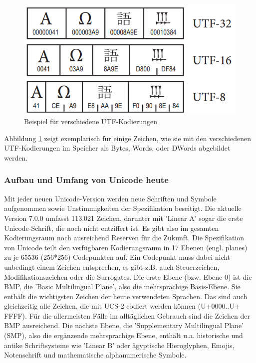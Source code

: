 \begin{figure}[h]
\centering
\includegraphics[width=.67\textwidth]{img/utf-8-16-32.png}
\caption[Vergleich verschiedener UTF-Kodierungen]{Beispiel für verschiedene UTF-Kodierungen\footnotemark}
\label{UTF}
\end{figure}


Abbildung \ref{UTF} zeigt exemplarisch für einige Zeichen, wie sie mit den verschiedenen UTF-Kodierungen im Speicher als Bytes, Words, oder DWords abgebildet werden.

\subsubsection{Aufbau und Umfang von Unicode heute}
Mit jeder neuen Unicode-Version werden neue Schriften und Symbole aufgenommen sowie Unstimmigkeiten der Spezifikation beseitigt.
Die aktuelle Version 7.0.0 umfasst 113.021 Zeichen, darunter mit 'Linear A' sogar die erste Unicode-Schrift, die noch nicht entziffert ist.
Es gibt also im gesamten Kodierungsraum noch ausreichend Reserven für die Zukunft.
Die Spezifikation von Unicode teilt den verfügbaren Kodierungsraum in 17 Ebenen (engl. planes) zu je 65536 (256*256) Codepunkten auf.
Ein Codepunkt muss dabei nicht unbedingt einem Zeichen entsprechen, es gibt z.B. auch Steuerzeichen, Modifikationszeichen oder die Surrogates.
Die erste Ebene (bzw. Ebene 0) ist die BMP, die 'Basic Multilingual Plane', also die mehrsprachige Basis-Ebene.
Sie enthält die wichtigsten Zeichen der heute verwendeten Sprachen. Das sind auch gleichzeitig alle Zeichen, die mit UCS-2 codiert werden können (U+0000..U+​FFFF). Für die allermeisten Fälle im alltäglichen Gebrauch sind die Zeichen der BMP ausreichend. 
Die nächste Ebene, die 'Supplementary Multilingual Plane' (SMP), also die ergänzende mehrsprachige Ebene, enthält u.a. historische und antike Schriftsysteme wie 'Linear B' oder ägyptische Hieroglyphen, Emojis, Notenschrift und mathematische alphanumerische Symbole.

